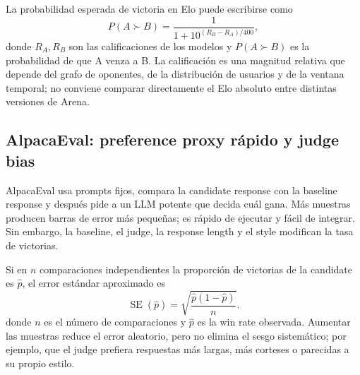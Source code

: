 
La probabilidad esperada de victoria en Elo puede escribirse como
\[
P(A\succ B)=\frac{1}{1+10^{(R_B-R_A)/400}},
\]
donde $R_A,R_B$ son las calificaciones de los modelos y $P(A\succ B)$ es la probabilidad de que A venza a B. La calificación es una magnitud relativa que depende del grafo de oponentes, de la distribución de usuarios y de la ventana temporal; no conviene comparar directamente el Elo absoluto entre distintas versiones de Arena.


\subsection{AlpacaEval: preference proxy rápido y judge bias}

AlpacaEval usa prompts fijos, compara la candidate response con la baseline response y después pide a un LLM potente que decida cuál gana. Más muestras producen barras de error más pequeñas; es rápido de ejecutar y fácil de integrar. Sin embargo, la baseline, el judge, la response length y el style modifican la tasa de victorias.



Si en $n$ comparaciones independientes la proporción de victorias de la candidate es $\hat p$, el error estándar aproximado es
\[
\operatorname{SE}(\hat p)=\sqrt{\frac{\hat p(1-\hat p)}{n}}.
\]
donde $n$ es el número de comparaciones y $\hat p$ es la win rate observada. Aumentar las muestras reduce el error aleatorio, pero no elimina el sesgo sistemático; por ejemplo, que el judge prefiera respuestas más largas, más corteses o parecidas a su propio estilo.


